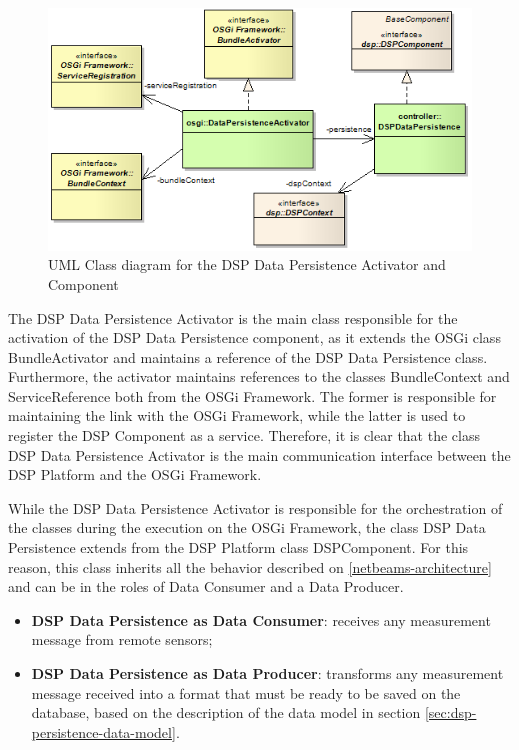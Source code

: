 \begin{figure}[!h]
  \centering
  \includegraphics[scale=0.5]{../diagrams/DSP-DataPersistence-Activator-Class-Diagram}
  \caption{UML Class diagram for the DSP Data Persistence Activator and Component}
  \label{fig:DSP-DataPersistence-Activator-Class-Diagram}
\end{figure}

The DSP Data Persistence Activator is the main class responsible for the
activation of the DSP Data Persistence component, as it extends the OSGi class
BundleActivator and maintains a reference of the DSP Data Persistence class.
Furthermore, the activator maintains references to the classes BundleContext
and ServiceReference both from the OSGi Framework. The former is responsible
for maintaining the link with the OSGi Framework, while the latter is used to
register the DSP Component as a service. Therefore, it is clear that the class
DSP Data Persistence Activator is the main communication interface between the
DSP Platform and the OSGi Framework.

While the DSP Data Persistence Activator is responsible for the orchestration
of the classes during the execution on the OSGi Framework, the class DSP Data
Persistence extends from the DSP Platform class DSPComponent. For this reason,
this class inherits all the behavior described on \ref{netbeams-architecture}
and can be in the roles of Data Consumer and a Data Producer.

\begin{itemize}
  \item \textbf{DSP Data Persistence as Data Consumer}: receives any measurement
  message from remote sensors;
  \item \textbf{DSP Data Persistence as Data Producer}: transforms any
  measurement message received into a format that must be ready to be saved on the
  database, based on the description of the data model in section
  \ref{sec:dsp-persistence-data-model}.
\end{itemize}

